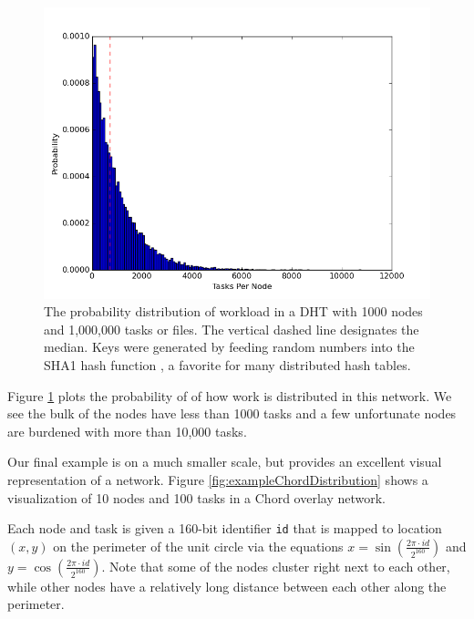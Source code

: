 \documentclass[10pt,conference]{IEEEtran}
\begin{document}
\begin{figure}[h!]
	\centering
	\includegraphics[width=0.9\linewidth]{figs/workloadDistribution}
	\caption[Workload Distribution in a DHT]{The probability distribution of workload in a DHT with 1000 nodes and 1,000,000 tasks or files.  The vertical dashed line designates the median.  Keys were generated by feeding random numbers into the SHA1 hash function \cite{sha1}, a favorite for many distributed hash tables.}
	\label{fig:workloadDistribution}
\end{figure}

Figure \ref{fig:workloadDistribution} plots the probability of of how work is distributed in this network.
We see the bulk of the nodes have less than 1000 tasks and a few unfortunate nodes are burdened with more than 10,000 tasks.


Our final example is on a much smaller scale, but provides an excellent visual representation of a network.
Figure \ref{fig:exampleChordDistribution} shows a visualization of 10 nodes and 100 tasks in a Chord overlay network.

Each node and task is given a 160-bit identifier \texttt{id} that is mapped to location $ (x,y) $ on the perimeter of the unit circle via the equations $ x = \sin\left( \frac{ 2 \pi \cdot id}{2^{160}} \right)$ and $ y = \cos\left( \frac{ 2 \pi \cdot id}{2^{160}} \right)$. 
Note that some of the nodes cluster right next to each other, while other nodes have a relatively long distance between each other along the perimeter.  
\end{document}
